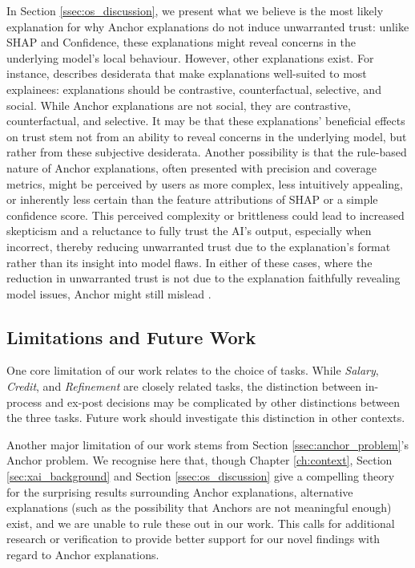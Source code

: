 In Section \ref{ssec:os_discussion}, we present what we believe is the most likely explanation for why Anchor explanations do not induce unwarranted trust: unlike SHAP and Confidence, these explanations might reveal concerns in the underlying model's local behaviour. However, other explanations exist. For instance, \textcite{miller_explanation_2017} describes desiderata that make explanations well-suited to most explainees: explanations should be contrastive, counterfactual, selective, and social. While Anchor explanations are not social, they are contrastive, counterfactual, and selective. It may be that these explanations' beneficial effects on trust stem not from an ability to reveal concerns in the underlying model, but rather from these subjective desiderata. Another possibility is that the rule-based nature of Anchor explanations, often presented with precision and coverage metrics, might be perceived by users as more complex, less intuitively appealing, or inherently less certain than the feature attributions of SHAP or a simple confidence score. This perceived complexity or brittleness could lead to increased skepticism and a reluctance to fully trust the AI's output, especially when incorrect, thereby reducing unwarranted trust due to the explanation's format rather than its insight into model flaws. In either of these cases, where the reduction in unwarranted trust is not due to the explanation faithfully revealing model issues, Anchor might still mislead \cite{Lipton}.

\subsection{Limitations and Future Work}
One core limitation of our work relates to the choice of tasks. While \emph{Salary}, \emph{Credit}, and \emph{Refinement} are closely related tasks, the distinction between in-process and ex-post decisions may be complicated by other distinctions between the three tasks. Future work should investigate this distinction in other contexts.

Another major limitation of our work stems from Section \ref{ssec:anchor_problem}'s Anchor problem. We recognise here that, though Chapter \ref{ch:context}, Section \ref{sec:xai_background} and Section \ref{ssec:os_discussion} give a compelling theory for the surprising results surrounding Anchor explanations, alternative explanations (such as the possibility that Anchors are not meaningful enough) exist, and we are unable to rule these out in our work. This calls for additional research or verification to provide better support for our novel findings with regard to Anchor explanations.

